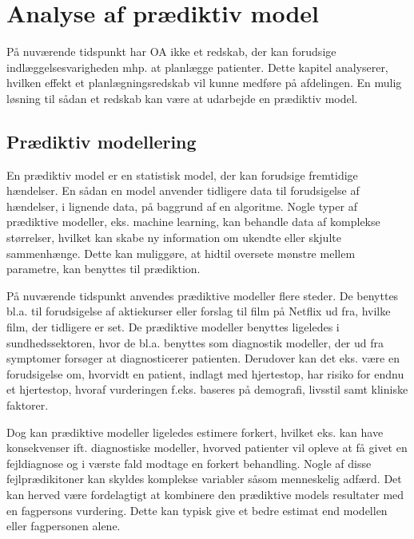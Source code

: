 \chapter{Analyse af prædiktiv model}
På nuværende tidspunkt har OA ikke et redskab, der kan forudsige indlæggelsesvarigheden mhp. at planlægge patienter. Dette kapitel analyserer, hvilken effekt et planlægningsredskab vil kunne medføre  på afdelingen. En mulig løsning til sådan et redskab kan være at udarbejde en prædiktiv model. 


\section{Prædiktiv modellering} \label{praemodel}
En prædiktiv model er en statistisk model, der kan forudsige fremtidige hændelser. En sådan en model anvender tidligere data til forudsigelse af hændelser, i lignende data, på baggrund af en algoritme. Nogle typer af prædiktive modeller, eks. machine learning, kan behandle data af komplekse størrelser, hvilket kan skabe ny information om ukendte eller skjulte sammenhænge. Dette kan muliggøre, at hidtil oversete mønstre mellem parametre, kan benyttes til prædiktion. 

På nuværende tidspunkt anvendes prædiktive modeller flere steder. De benyttes bl.a. til forudsigelse af aktiekurser eller forslag til film på Netflix ud fra, hvilke film, der tidligere er set.\cite{DIKU2012}
De prædiktive modeller benyttes ligeledes i sundhedssektoren, hvor de bl.a. benyttes som diagnostik modeller, der ud fra symptomer forsøger at diagnosticerer patienten.\cite{Kuhn2013} Derudover kan det eks. være en forudsigelse om, hvorvidt en patient, indlagt med hjertestop, har risiko for endnu et hjertestop, hvoraf vurderingen f.eks. baseres på demografi, livsstil samt kliniske faktorer\cite{Hastie2008}. 

Dog kan prædiktive modeller ligeledes estimere forkert, hvilket eks. kan have konsekvenser ift. diagnostiske modeller, hvorved patienter vil opleve at få givet en fejldiagnose og i værste fald modtage en forkert behandling. Nogle af disse fejlprædikitoner kan skyldes komplekse variabler såsom menneskelig adfærd. Det kan herved være fordelagtigt at kombinere den prædiktive models resultater med en fagpersons vurdering. Dette kan typisk give et bedre estimat end modellen eller fagpersonen alene.\cite{Kuhn2013} 

